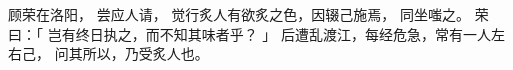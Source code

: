 
\switchcolumn*[\section{}]

顾荣在洛阳，
尝应人请，
觉行炙人有欲炙之色，因辍己施焉，
同坐嗤之。
荣曰：「
    岂有终日执之，而不知其味者乎？
」
后遭乱渡江，每经危急，常有一人左右己，
问其所以，乃受炙人也。

\switchcolumn



